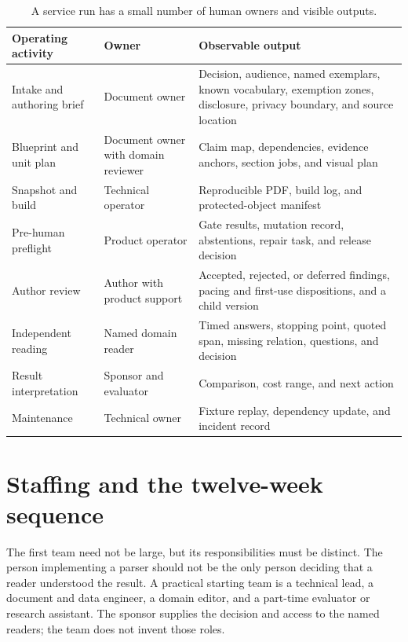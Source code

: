 \begin{table}[H]
\centering
\small
\begin{tabularx}{\textwidth}{@{}p{}p{}L@{}}
\toprule
Operating activity & Owner & Observable output \\
\midrule
Intake and authoring brief & Document owner & Decision, audience, named
exemplars, known vocabulary, exemption zones, disclosure, privacy boundary,
and source location \\
Blueprint and unit plan & Document owner with domain reviewer & Claim map,
dependencies, evidence anchors, section jobs, and visual plan \\
Snapshot and build & Technical operator & Reproducible PDF, build log, and
protected-object manifest \\
Pre-human preflight & Product operator & Gate results, mutation record,
abstentions, repair task, and release decision \\
Author review & Author with product support & Accepted, rejected, or deferred
findings, pacing and first-use dispositions, and a child version \\
Independent reading & Named domain reader & Timed answers, stopping point,
quoted span, missing relation, questions, and decision \\
Result interpretation & Sponsor and evaluator & Comparison, cost range, and
next action \\
Maintenance & Technical owner & Fixture replay, dependency update, and
incident record \\
\bottomrule
\end{tabularx}
\caption{A service run has a small number of human owners and visible outputs.}
\label{tab:ops-activities}
\end{table}

\section{Staffing and the twelve-week sequence}
\label{sec:ops-staffing}

The first team need not be large, but its responsibilities must be distinct.
The person implementing a parser should not be the only person deciding that a
reader understood the result. A practical starting team is a technical lead, a
document and data engineer, a domain editor, and a part-time evaluator or
research assistant. The sponsor supplies the decision and access to the named
readers; the team does not invent those roles.

